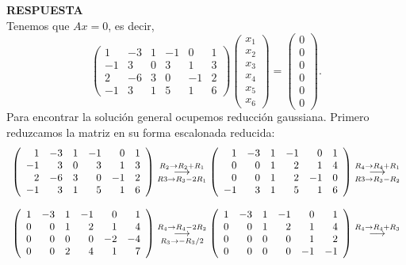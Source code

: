 \documentclass[11pt,letterpaper]{article}
\newcommand{\res}{\textbf{RESPUESTA}\\}
\newcommand{\grstep}[2][\relax]{%
   \ensuremath{\mathrel{
       {\mathop{\longrightarrow}\limits^{#2\mathstrut}_{
                                     \begin{subarray}{l} #1 \end{subarray}}}}}}
\begin{document}
\begin{enumerate}
\res
Tenemos que $Ax=0$, es decir,
\begin{equation*}
\left(\begin{array}{rrrrrr}
1  & -3 & 1 & -1 &  0 & 1\\
-1 &  3 & 0 &  3 &  1 & 3 \\
2  & -6 & 3 &  0 & -1 & 2\\
-1 &  3 & 1 &  5 &  1 & 6
\end{array}\right) \begin{pmatrix}
x_1\\
x_2\\
x_3\\
x_4\\
x_5\\
x_6
\end{pmatrix}=\begin{pmatrix}
0\\
0\\
0\\
0\\
0\\
0
\end{pmatrix}.
\end{equation*}
Para encontrar la solución general ocupemos reducción gaussiana. Primero reduzcamos la matriz en su forma escalonada reducida:
\begin{equation*}
\begin{array}{c}
\left(\begin{array}{rrrrrr}
1  & -3 & 1 & -1 &  0 & 1\\
-1 &  3 & 0 &  3 &  1 & 3 \\
2  & -6 & 3 &  0 & -1 & 2\\
-1 &  3 & 1 &  5 &  1 & 6
\end{array}\right) %
\grstep[R3 \rightarrow R_3 -2R_1]{R_2 \rightarrow R_2 +R_1}
%
\left(\begin{array}{rrrrrr}
1  & -3 & 1 & -1 &  0 & 1\\
0  &  0 & 1 &  2 &  1 & 4 \\
0  &  0 & 1 &  2 & -1 & 0\\
-1 &  3 & 1 &  5 &  1 & 6
\end{array}\right)%
\grstep[R3 \rightarrow R_3 -R_2]{R_4 \rightarrow R_4 +R_1}\\
\\
\left(\begin{array}{rrrrrr}
1  & -3 & 1 & -1 &  0 & 1\\
0  &  0 & 1 &  2 &  1 & 4 \\
0  &  0 & 0 &  0 & -2 &-4\\
0  &  0 & 2 &  4 &  1 & 7
\end{array}\right)%
\grstep[R_3 \rightarrow -R_3/2]{R_4 \rightarrow R_4-2R_2}
%
\left(\begin{array}{rrrrrr}
1  & -3 & 1 & -1 &  0 & 1\\
0  &  0 & 1 &  2 &  1 & 4 \\
0  &  0 & 0 &  0 &  1 & 2\\
0  &  0 & 0 &  0 & -1 & -1
\end{array}\right)%
\grstep[]{R_4 \rightarrow R_4+R_3}
\end{array}
\end{equation*}


\end{enumerate}
\end{document}
